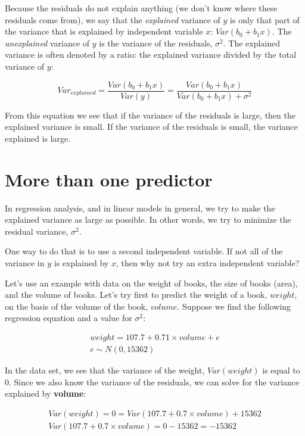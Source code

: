 \documentclass[]{report}\usepackage[]{graphicx}\usepackage[]{color}
\begin{document}
Because the residuals do not explain anything (we don't know where these residuals come from), we say that the \textit{explained} variance of $y$ is only that part of the variance that is explained by independent variable $x$: $Var(b_0 + b_1 x)$. The \textit{unexplained} variance of $y$ is the variance of the residuals, $\sigma^2$. The explained variance is often denoted by a ratio: the explained variance divided by the total variance of $y$:


\begin{equation}
Var_{explained} = \frac{Var(b_0+b_1 x)}{Var(y)} = \frac{Var(b_0+b_1 x)}{Var(b_0+b_1 x) + \sigma^2}
\end{equation}

From this equation we see that if the variance of the residuals is large, then the explained variance is small. If the variance of the residuals is small, the variance explained is large.


\section{More than one predictor}

In regression analysis, and in linear models in general, we try to make the explained variance as large as possible. In other words, we try to minimize the residual variance, $\sigma^2$.

One way to do that is to use a second independent variable. If not all of the variance in $y$ is explained by $x$, then why not try an extra independent variable?


Let's use an example with data on the weight of books, the size of books (area), and the volume of books. Let's try first to predict the weight of a book, $weight$, on the basis of the volume of the book, $volume$. Suppose we find the following regression equation and a value for $\sigma^2$:






\begin{eqnarray}
weight = 107.7 + 0.71 \times  volume + e \\
e \sim N(0, 15362)
\end{eqnarray}


In the data set, we see that the variance of the weight, $Var(weight)$ is equal to 0. Since we also know the variance of the residuals, we can solve for the variance explained by \textbf{volume}:


\begin{eqnarray}
Var(weight) =  0=   Var(107.7 + 0.7 \times  volume) + 15362 \nonumber\\
Var(107.7 + 0.7 \times  volume) = 0- 15362= -15362\nonumber
\end{eqnarray}
\end{document}
